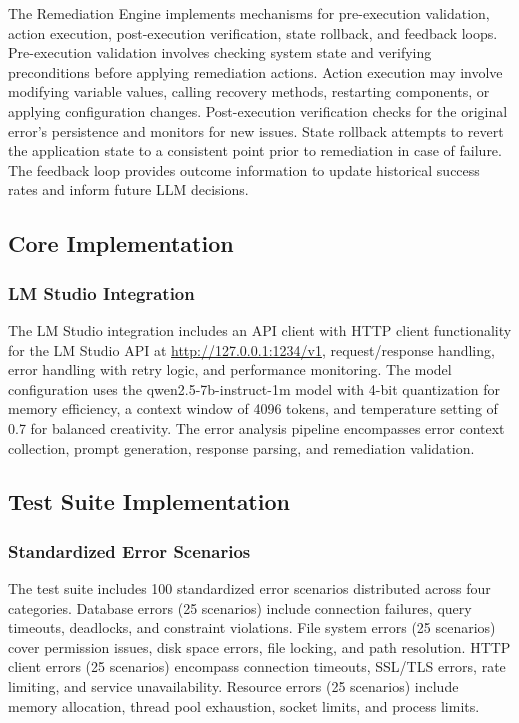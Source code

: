 The Remediation Engine implements mechanisms for pre-execution validation, action execution, post-execution verification, state rollback, and feedback loops. Pre-execution validation involves checking system state and verifying preconditions before applying remediation actions. Action execution may involve modifying variable values, calling recovery methods, restarting components, or applying configuration changes. Post-execution verification checks for the original error's persistence and monitors for new issues. State rollback attempts to revert the application state to a consistent point prior to remediation in case of failure. The feedback loop provides outcome information to update historical success rates and inform future LLM decisions.

\subsection{Core Implementation}

\subsubsection{LM Studio Integration}
The LM Studio integration includes an API client with HTTP client functionality for the LM Studio API at \url{http://127.0.0.1:1234/v1}, request/response handling, error handling with retry logic, and performance monitoring. The model configuration uses the qwen2.5-7b-instruct-1m model with 4-bit quantization for memory efficiency, a context window of 4096 tokens, and temperature setting of 0.7 for balanced creativity. The error analysis pipeline encompasses error context collection, prompt generation, response parsing, and remediation validation.

\subsection{Test Suite Implementation}

\subsubsection{Standardized Error Scenarios}
The test suite includes 100 standardized error scenarios distributed across four categories. Database errors (25 scenarios) include connection failures, query timeouts, deadlocks, and constraint violations. File system errors (25 scenarios) cover permission issues, disk space errors, file locking, and path resolution. HTTP client errors (25 scenarios) encompass connection timeouts, SSL/TLS errors, rate limiting, and service unavailability. Resource errors (25 scenarios) include memory allocation, thread pool exhaustion, socket limits, and process limits.

